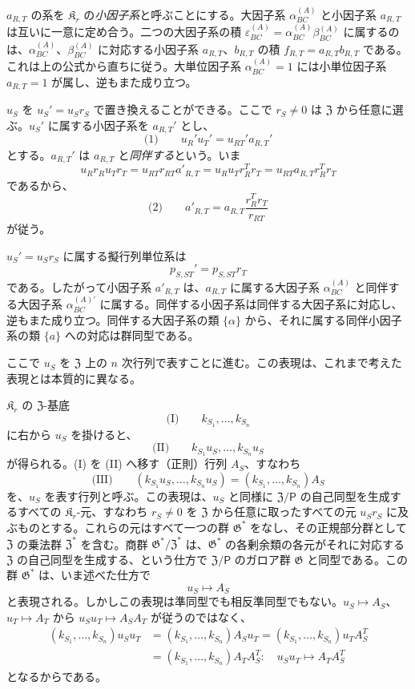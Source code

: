 \(a_{R,T}\) の系を \(\mathfrak K_r\) の\emph{小因子系}と呼ぶことにする。大因子系 \(\alpha_{BC}^{(A)}\) と小因子系 \(a_{R,T}\) は互いに一意に定め合う。二つの大因子系の積 \(\varepsilon_{BC}^{(A)}=\alpha_{BC}^{(A)}\beta_{BC}^{(A)}\) に属するのは、\(\alpha_{BC}^{(A)}\)、\(\beta_{BC}^{(A)}\) に対応する小因子系 \(a_{R,T}\)、\(b_{R,T}\) の積 \(f_{R,T}=a_{R,T}b_{R,T}\) である。これは上の公式から直ちに従う。大単位因子系 \(\alpha_{BC}^{(A)}=1\) には小単位因子系 \(a_{R,T}=1\) が属し、逆もまた成り立つ。

\(u_S\) を \(u_S'=u_Sr_S\) で置き換えることができる。ここで \(r_S\neq 0\) は \(\mathfrak Z\) から任意に選ぶ。\(u_S'\) に属する小因子系を \(a_{R,T}'\) とし、
\[
\text{(1)}\qquad u_R'u_T'=u_{RT}'a_{R,T}'
\]
とする。\(a_{R,T}'\) は \(a_{R,T}\) と\emph{同伴する}という。いま
\[
u_R r_R u_T r_T=u_{RT}r_{RT}a'_{R,T}
=u_Ru_T r_R^T r_T=u_{RT}a_{R,T}r_R^T r_T
\]
であるから、
\[
\text{(2)}\qquad a'_{R,T}=a_{R,T}\frac{r_R^T r_T}{r_{RT}}
\]
が従う。

\(u_S'=u_Sr_S\) に属する擬行列単位系は
\[
p_{S,ST}'=p_{S,ST}r_T
\]
である。したがって小因子系 \(a'_{R,T}\) は、\(a_{R,T}\) に属する大因子系 \(\alpha_{BC}^{(A)}\) と同伴する大因子系 \(\alpha_{BC}^{(A)\prime}\) に属する。同伴する小因子系は同伴する大因子系に対応し、逆もまた成り立つ。同伴する大因子系の類 \(\{\alpha\}\) から、それに属する同伴小因子系の類 \(\{a\}\) への対応は群同型である。

ここで \(u_S\) を \(\mathfrak Z\) 上の \(n\) 次行列で表すことに進む。この表現は、これまで考えた表現とは本質的に異なる。

\(\mathfrak K_r\) の \(\mathfrak Z\)-基底
\[
\text{(I)}\qquad k_{S_1},\ldots,k_{S_n}
\]
に右から \(u_S\) を掛けると、
\[
\text{(II)}\qquad k_{S_1}u_S,\ldots,k_{S_n}u_S
\]
が得られる。(I) を (II) へ移す（正則）行列 \(A_S\)、すなわち
\[
\text{(III)}\qquad
(k_{S_1}u_S,\ldots,k_{S_n}u_S)
=(k_{S_1},\ldots,k_{S_n})A_S
\]
を、\(u_S\) を表す行列と呼ぶ。この表現は、\(u_S\) と同様に \(\mathfrak Z/\mathsf P\) の自己同型を生成するすべての \(\mathfrak K_r\)-元、すなわち \(r_S\ne0\) を \(\mathfrak Z\) から任意に取ったすべての元 \(u_Sr_S\) に及ぶものとする。これらの元はすべて一つの群 \(\mathfrak G^*\) をなし、その正規部分群として \(\mathfrak Z\) の乗法群 \(\mathfrak Z^*\) を含む。商群 \(\mathfrak G^*/\mathfrak Z^*\) は、\(\mathfrak G^*\) の各剰余類の各元がそれに対応する \(\mathfrak Z\) の自己同型を生成する、という仕方で \(\mathfrak Z/\mathsf P\) のガロア群 \(\mathfrak G\) と同型である。この群 \(\mathfrak G^*\) は、いま述べた仕方で
\[
u_S\mapsto A_S
\]
と表現される。しかしこの表現は準同型でも相反準同型でもない。\(u_S\mapsto A_S\)、\(u_T\mapsto A_T\) から \(u_Su_T\mapsto A_SA_T\) が従うのではなく、
\[
\begin{aligned}
(k_{S_1},\ldots,k_{S_n})u_Su_T
&=(k_{S_1},\ldots,k_{S_n})A_Su_T
=(k_{S_1},\ldots,k_{S_n})u_TA_S^T\\
&=(k_{S_1},\ldots,k_{S_n})A_TA_S^T:
\quad u_Su_T\mapsto A_TA_S^T
\end{aligned}
\]
となるからである。

